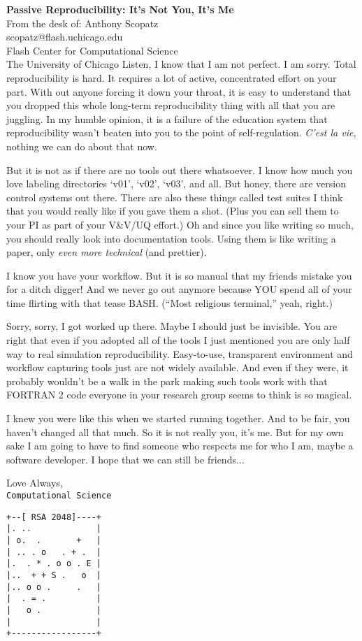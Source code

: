 \documentclass[10pt]{letter}
\begin{document}
\begin{letter}{
{\bf Passive Reproducibility: It's Not You, It's Me}\\
From the desk of: Anthony Scopatz\\
scopatz@flash.uchicago.edu\\
Flash Center for Computational Science\\
The University of Chicago
}
Listen, I know that I am not perfect.  I am sorry.  Total reproducibility is hard.
It requires a lot of active, concentrated effort on your part.  With out anyone 
forcing it down your throat, it is easy to understand that you dropped this whole 
long-term reproducibility thing with all that you are juggling.  In my humble 
opinion, it is a failure of the education system that reproducibility wasn't 
beaten into you to the point of self-regulation.  \emph{C'est la vie}, nothing we can 
do about that now.

But it is not as if there are no tools out there whatsoever.  I know how much you
love labeling directories `v01', `v02', `v03', and all.  But honey, there are version 
control systems out there.  There are also these things called test suites I think 
that you would really like if you gave them a shot.  (Plus you can sell them to your 
PI as part of your V\&V/UQ effort.)  Oh and since you like writing so much, you should 
really look into documentation tools.  Using them is like writing a paper, only
\emph{even more technical} (and prettier).

I know you have your workflow.  But it is so manual that my friends mistake you for
a ditch digger!  And we never go out anymore because YOU spend all of your time 
flirting with that tease BASH.  (``Most religious terminal,'' yeah, right.)

Sorry, sorry, I got worked up there.  Maybe I should just be invisible.  You are 
right that even if you adopted all of the tools I just mentioned you are only
half way to real simulation reproducibility.  Easy-to-use, transparent environment
and workflow capturing tools just are not widely available.  And even if
they were, it probably wouldn't be a walk in the park making such tools work with
that FORTRAN 2 code everyone in your research group seems to think is so magical.   

I knew you were like this when we started running together.  And to be fair, you 
haven't changed all that much.  So it is not really you, it's me. But for my own sake 
I am going to have to find someone who respects me for who I am, maybe 
a software developer.  I hope that we can still be friends...


Love Always,\\
{\tt Computational Science}
\begin{verbatim}
+--[ RSA 2048]----+
|. ..             |
| o.  .       +   |
| .. . o   . + .  |
|.  . * . o o . E |
|..  + + S .   o  |
|.. o o .     .   |
|  . = .          |
|   o .           |
|                 |
+-----------------+
\end{verbatim}


\end{letter}
\end{document}
